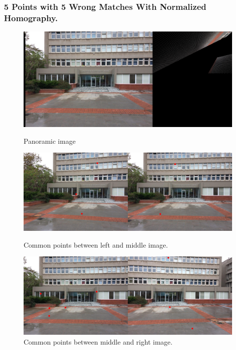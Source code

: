 \documentclass[letterpaper,12pt]{article}
\begin{document}
\subsubsection{5 Points with 5 Wrong Matches With Normalized Homography.}
\begin{figure}[!htb]
        \centering\includegraphics[width=1\columnwidth]{experiments/5points/norm/final5wrong.jpg}
          \caption{
                \label{} Panoramic image
        }
        \centering\includegraphics[width=1\columnwidth]{experiments/5points/norm/left-1_middle5wrong.jpg}
          \caption{
                \label{} Common points between left and middle image.
        }
        
        \centering\includegraphics[width=1\columnwidth]{experiments/5points/norm/middle_left-15wrong.jpg}
        \caption{
                \label{} Common points between middle and right image.
        }
\end{figure}
\FloatBarrier
\newpage
\end{document}
